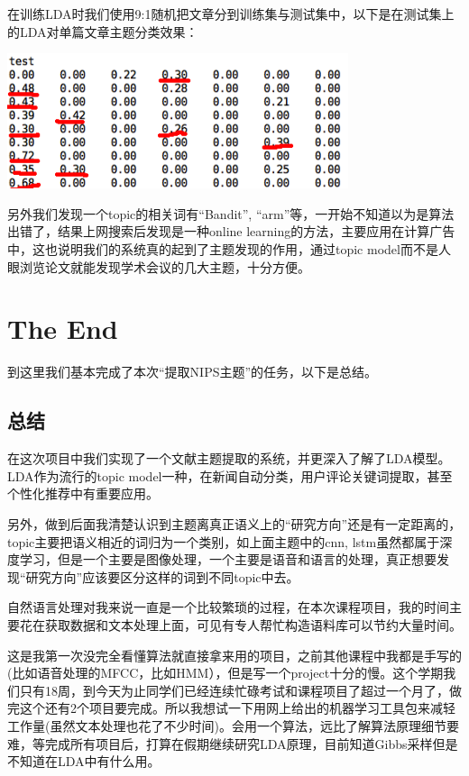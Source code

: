 \documentclass{article}
\begin{document}
在训练LDA时我们使用9:1随机把文章分到训练集与测试集中，以下是在测试集上的LDA对单篇文章主题分类效果：
\begin{center}
	\includegraphics[width=10cm]{result/v2.0/single-doc}
\end{center}

另外我们发现一个topic的相关词有``Bandit'', ``arm''等，一开始不知道以为是算法出错了，结果上网搜索后发现是一种online learning的方法，主要应用在计算广告中，这也说明我们的系统真的起到了主题发现的作用，通过topic model而不是人眼浏览论文就能发现学术会议的几大主题，十分方便。

\section{The End}
到这里我们基本完成了本次``提取NIPS主题''的任务，以下是总结。
\subsection{总结}
在这次项目中我们实现了一个文献主题提取的系统，并更深入了解了LDA模型。LDA作为流行的topic model一种，在新闻自动分类，用户评论关键词提取，甚至个性化推荐中有重要应用。

另外，做到后面我清楚认识到主题离真正语义上的``研究方向''还是有一定距离的，topic主要把语义相近的词归为一个类别，如上面主题中的cnn, lstm虽然都属于深度学习，但是一个主要是图像处理，一个主要是语音和语言的处理，真正想要发现``研究方向''应该要区分这样的词到不同topic中去。

自然语言处理对我来说一直是一个比较繁琐的过程，在本次课程项目，我的时间主要花在获取数据和文本处理上面，可见有专人帮忙构造语料库可以节约大量时间。

这是我第一次没完全看懂算法就直接拿来用的项目，之前其他课程中我都是手写的(比如语音处理的MFCC，比如HMM），但是写一个project十分的慢。这个学期我们只有18周，到今天为止同学们已经连续忙碌考试和课程项目了超过一个月了，做完这个还有2个项目要完成。所以我想试一下用网上给出的机器学习工具包来减轻工作量(虽然文本处理也花了不少时间)。会用一个算法，远比了解算法原理细节要难，等完成所有项目后，打算在假期继续研究LDA原理\cite{6}，目前知道Gibbs采样但是不知道在LDA中有什么用。
\end{document}
